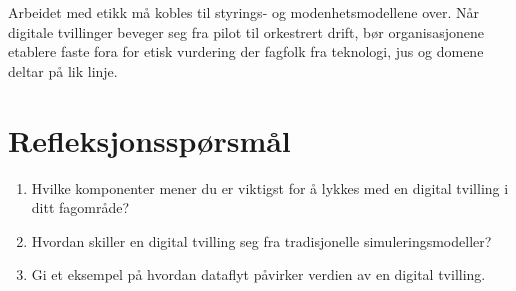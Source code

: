 Arbeidet med etikk må kobles til styrings- og modenhetsmodellene over. Når digitale tvillinger beveger seg fra pilot til orkestrert drift, bør organisasjonene etablere faste fora for etisk vurdering der fagfolk fra teknologi, jus og domene deltar på lik linje.

\section{Refleksjonsspørsmål}
\begin{enumerate}
    \item Hvilke komponenter mener du er viktigst for å lykkes med en digital tvilling i ditt fagområde?
    \item Hvordan skiller en digital tvilling seg fra tradisjonelle simuleringsmodeller?
    \item Gi et eksempel på hvordan dataflyt påvirker verdien av en digital tvilling.
\end{enumerate}

